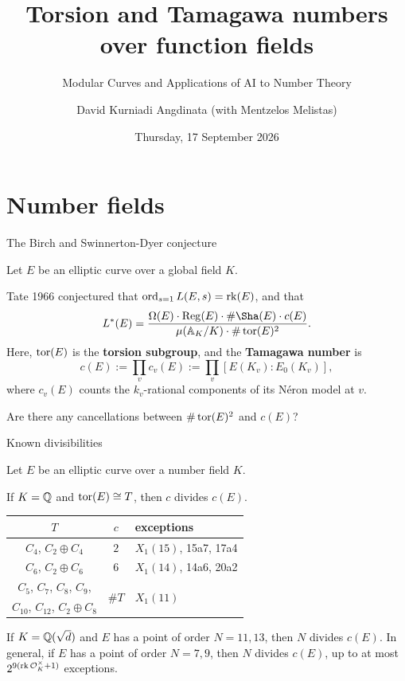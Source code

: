 
\title{Torsion and Tamagawa numbers over function fields}
\subtitle{Modular Curves and Applications of AI to Number Theory}
\author{David Kurniadi Angdinata (with Mentzelos Melistas)}
\date{Thursday, 17 September 2026}



\frame{\titlepage}

\section{Number fields}

\begin{frame}{The Birch and Swinnerton-Dyer conjecture}

Let $ E $ be an elliptic curve over a global field $ K $.

\bigskip Tate 1966 conjectured that $ \operatorname{ord}_{s = 1} L(E, s) = \operatorname{rk}(E) $, and that
$$ L^*(E) = \dfrac{\Omega(E) \cdot \Reg(E) \cdot \#\Sha(E) \cdot c(E)}{\mu(\A_K / K) \cdot \#\tor(E)^2}. $$
Here, $ \operatorname{tor}(E) $ is the \textbf{torsion subgroup}, and the \textbf{Tamagawa number} is
$$ c(E) := \prod_v c_v(E) := \prod_v [E(K_v) : E_0(K_v)], $$
where $ c_v(E) $ counts the $ k_v $-rational components of its N\'eron model at $ v $.

\bigskip Are there any cancellations between $ \#\operatorname{tor}(E)^2 $ and $ c(E) $?

\end{frame}

\begin{frame}{Known divisibilities}

Let $ E $ be an elliptic curve over a number field $ K $.

\begin{theorem}[Lorenzini 2011]
If $ K = \mathbb{Q} $ and $ \operatorname{tor}(E) \cong T $, then $ c $ divides $ c(E) $.
\begin{center}
\begin{tabular}{|c|c|l|}
\hline
$ T $ & $ c $ & exceptions \\
\hline
$ C_4 $, $ C_2 \oplus C_4 $ & $ 2 $ & $ X_1(15) $, 15a7, 17a4 \\
\hline
$ C_6 $, $ C_2 \oplus C_6 $ & $ 6 $ & $ X_1(14) $, 14a6, 20a2 \\
\hline
$ C_5 $, $ C_7 $, $ C_8 $, $ C_9 $, & \multirow{2}{*}{$ \#T $} & \multirow{2}{*}{$ X_1(11) $} \\
$ C_{10} $, $ C_{12} $, $ C_2 \oplus C_8 $ & & \\
\hline
\end{tabular}
\end{center}
If $ K = \mathbb{Q}(\sqrt{d}) $ and $ E $ has a point of order $ N = 11, 13 $, then $ N $ divides $ c(E) $. In general, if $ E $ has a point of order $ N = 7, 9 $, then $ N $ divides $ c(E) $, up to at most $ 2^{9(\operatorname{rk}\mathcal{O}_K^\times + 1)} $ exceptions.
\end{theorem}

\end{frame}


